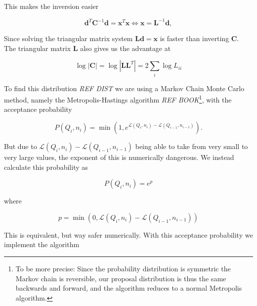 \documentclass{emulateapj}
\begin{document}
This makes the inversion easier

\begin{equation}
\mathbf{d}^T\mathbf{C}^{-1}\mathbf{d} = \mathbf{x}^T\mathbf{x} \Leftrightarrow \mathbf{x} = \mathbf{L}^{-1}\mathbf{d},
\end{equation}
 
Since solving the triangular matrix system $\mathbf{L}\mathbf{d} = \mathbf{x}$ is faster than inverting $\mathbf{C}$. The triangular matrix $\mathbf{L}$ also gives us the advantage at

\begin{equation}
\log|\mathbf{C}| = \log |\mathbf{L}\mathbf{L}^T| = 2\sum_i \log L_{ii}
\end{equation}

To find this distribution \emph{REF DIST} we are using a Markov Chain Monte Carlo method, namely the Metropolis-Hastings algorithm \emph{REF BOOK}\footnote{To be more precise: Since the probability distribution is symmetric the Markov chain is reversible, our proposal distribution is thus the same backwards and forward, and the algorithm reduces to a normal Metropolis algorithm.}, with the acceptance probability

\begin{equation}
P(Q_i,n_i) = \min\left(1,e^{\mathcal{L}(Q_{i},n_{i})-\mathcal{L}(Q_{i-1},n_{i-1})}\right).
\end{equation} 

But due to $\mathcal{L}(Q_{i},n_{i})-\mathcal{L}(Q_{i-1},n_{i-1})$ being able to take from very small to very large values, the exponent of this is numerically dangerous. We instead calculate this probability as

\begin{equation}
P(Q_i,n_i) = e^{p}
\label{eq:AccProb}
\end{equation}

where

\begin{equation}
p = \min\left(0,\mathcal{L}(Q_{i},n_{i})-\mathcal{L}(Q_{i-1},n_{i-1})\right)
\end{equation}

This is equivalent, but way safer numerically. With this acceptance probability we implement the algorithm
\end{document}
